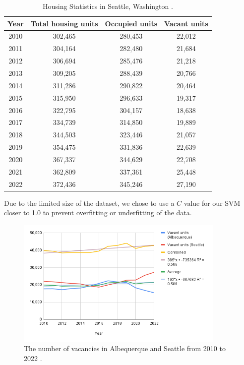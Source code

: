 \documentclass[12pt]{article}
\begin{document}
\begin{table}[H]
  \centering
  \begin{tabular}{|c c c c|}
    \hline
    Year & Total housing units & Occupied units & Vacant units \\ [0.5ex]
    \hline
    2010 & 302,465 & 280,453 & 22,012 \\
    2011 & 304,164 & 282,480 & 21,684 \\
    2012 & 306,694 & 285,476 & 21,218 \\
    2013 & 309,205 & 288,439 & 20,766 \\
    2014 & 311,286 & 290,822 & 20,464 \\
    2015 & 315,950 & 296,633 & 19,317 \\
    2016 & 322,795 & 304,157 & 18,638 \\
    2017 & 334,739 & 314,850 & 19,889 \\
    2018 & 344,503 & 323,446 & 21,057 \\
    2019 & 354,475 & 331,836 & 22,639 \\
    2020 & 367,337 & 344,629 & 22,708 \\
    2021 & 362,809 & 337,361 & 25,448 \\
    2022 & 372,436 & 345,246 & 27,190 \\ [1ex]
    \hline
  \end{tabular}
  \caption{Housing Statistics in Seattle, Washington \cite{Census2010ACSDP5Y2010.DP04}.}
\end{table}

\noindent
Due to the limited size of the dataset, we chose to use a $C$ value for our SVM closer to 1.0 to prevent overfitting or
underfitting of the data. 

\begin{figure}[H]
  \centering
  \includegraphics[width=0.9\textwidth]{chart1}
  \caption{The number of vacancies in Albequerque and Seattle from 2010 to 2022 \cite{Census2010ACSDP1Y2010.DP04,Census2010ACSDP5Y2010.DP04}.}
\end{figure}
\end{document}
